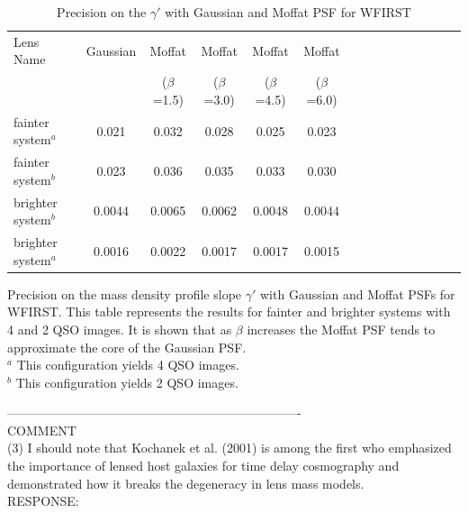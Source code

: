 \documentclass[a4paper,11pt]{article}
\begin{document}
\begin{table}\footnotesize
\begin{center}
\caption{Precision on the $\gamma'$ with Gaussian and Moffat PSF for WFIRST}
\begin{tabular}{lcccccccccccccc|}
\hline \hline
Lens Name & Gaussian & Moffat & Moffat & Moffat & Moffat
\\
& & ($\beta$=1.5) & ($\beta$=3.0) & ($\beta$=4.5) & ($\beta$=6.0) \\
\hline
fainter system$^a$ & 0.021 & 0.032 & 0.028 & 0.025 & 0.023 \\
fainter system$^b$ & 0.023 & 0.036 & 0.035 & 0.033 & 0.030 \\
brighter system$^b$ & 0.0044 & 0.0065 & 0.0062 & 0.0048 & 0.0044 \\
brighter system$^a$ & 0.0016 & 0.0022 & 0.0017 & 0.0017 & 0.0015 \\
\hline
\hline
\end{tabular}
\begin{tablenotes}
\item
Precision on the mass density profile slope $\gamma'$ with Gaussian and Moffat PSFs for WFIRST. This table represents the results for fainter and brighter systems with 4 and 2 QSO images. It is shown that as $\beta$ increases the Moffat PSF tends to approximate the core of the Gaussian PSF. \\
$^a$ This configuration yields 4 QSO images. \\
$^b$ This configuration yields 2 QSO images. \\
\end{tablenotes}
\end{center}
\end{table}

----------------------------------------------------------------------
\\
COMMENT
\\
(3) I should note that Kochanek et al. (2001) is among the first who emphasized the importance of lensed host galaxies for time delay cosmography and demonstrated how it breaks the degeneracy in lens mass models.
\\

RESPONSE:
\\ 
\end{document}
